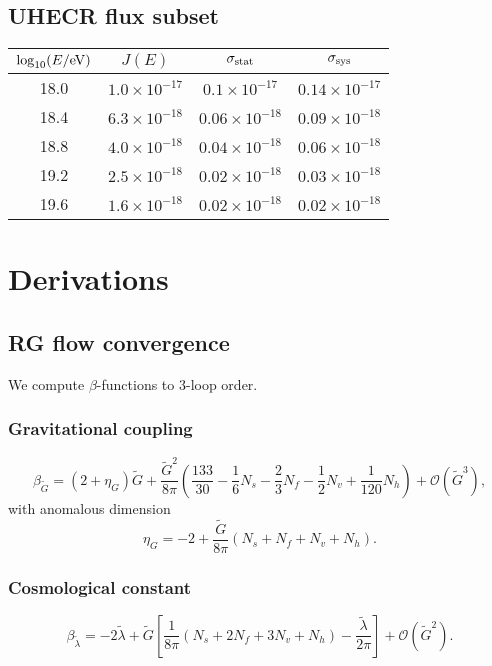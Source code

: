 \documentclass[%
 reprint,
 amsmath,amssymb,
 aps,
 pra,
 longbibliography,
 nofootinbib
]{revtex4-2}
\newcommand{\Ord}[1]{\mathcal{O}\!\left(#1\right)}
\begin{document}
\section{UHECR flux subset}
\begin{table}[h]
\centering
\begin{tabular}{c c c c}
\toprule
$\log_{10}(E/{\rm eV})$ & $J(E)$ & $\sigma_{\rm stat}$ & $\sigma_{\rm sys}$ \\
\midrule
18.0 & $1.0\times10^{-17}$ & $0.1\times10^{-17}$ & $0.14\times10^{-17}$ \\
18.4 & $6.3\times10^{-18}$ & $0.06\times10^{-18}$ & $0.09\times10^{-18}$ \\
18.8 & $4.0\times10^{-18}$ & $0.04\times10^{-18}$ & $0.06\times10^{-18}$ \\
19.2 & $2.5\times10^{-18}$ & $0.02\times10^{-18}$ & $0.03\times10^{-18}$ \\
19.6 & $1.6\times10^{-18}$ & $0.02\times10^{-18}$ & $0.02\times10^{-18}$ \\
\bottomrule
\end{tabular}
\end{table}
\chapter{Derivations}
\label{app:deriv}

\section{RG flow convergence}
We compute $\beta$-functions to 3-loop order.

\subsection{Gravitational coupling}
\begin{equation}
\beta_{\tilde G} = (2+\eta_G)\tilde G + \frac{\tilde G^2}{8\pi}
\left(\frac{133}{30}-\frac{1}{6}N_s-\frac{2}{3}N_f-\frac{1}{2}N_v+\frac{1}{120}N_h\right)
+ \Ord{\tilde G^3},
\end{equation}
with anomalous dimension
\begin{equation}
\eta_G = -2 + \frac{\tilde G}{8\pi}(N_s+N_f+N_v+N_h).
\end{equation}

\subsection{Cosmological constant}
\begin{equation}
\beta_{\tilde\lambda} = -2\tilde\lambda + \tilde G\left[\frac{1}{8\pi}(N_s+2N_f+3N_v+N_h)-\frac{\tilde\lambda}{2\pi}\right]
+ \Ord{\tilde G^2}.
\end{equation}
\end{document}
